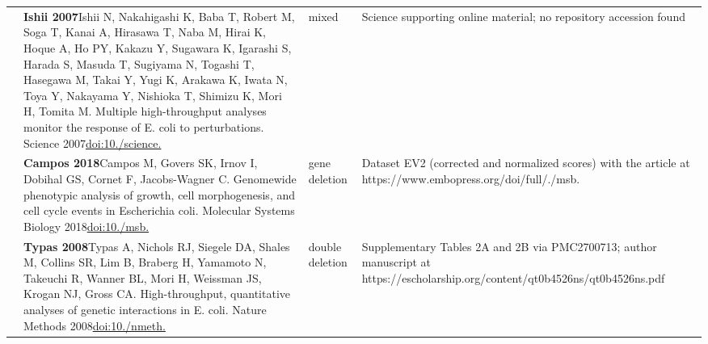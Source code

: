 \begin{landscape}
\begin{longtable}{@{}r@{\hspace{4pt}} L{86mm} L{74mm} L{78mm}@{}}
 & \textbf{Ishii 2007}\newline Ishii N, Nakahigashi K, Baba T, Robert M, Soga T, Kanai A, Hirasawa T, Naba M, Hirai K, Hoque A, Ho PY, Kakazu Y, Sugawara K, Igarashi S, Harada S, Masuda T, Sugiyama N, Togashi T, Hasegawa M, Takai Y, Yugi K, Arakawa K, Iwata N, Toya Y, Nakayama Y, Nishioka T, Shimizu K, Mori H, Tomita M. Multiple high-throughput analyses monitor the response of E. coli to perturbations. Science 2007\newline \href{https://doi.org/10.1126/science.1132067}{doi:10./\allowbreak science.} & mixed & Science supporting online material; no repository accession found \\
 & \textbf{Campos 2018}\newline Campos M, Govers SK, Irnov I, Dobihal GS, Cornet F, Jacobs-Wagner C. Genomewide phenotypic analysis of growth, cell morphogenesis, and cell cycle events in Escherichia coli. Molecular Systems Biology 2018\newline \href{https://doi.org/10.15252/msb.20177573}{doi:10./\allowbreak msb.} & gene deletion & Dataset EV2 (corrected and normalized scores) with the article at https:/\allowbreak /\allowbreak www.\allowbreak embopress.\allowbreak org/\allowbreak doi/\allowbreak full/./\allowbreak msb. \\
 & \textbf{Typas 2008}\newline Typas A, Nichols RJ, Siegele DA, Shales M, Collins SR, Lim B, Braberg H, Yamamoto N, Takeuchi R, Wanner BL, Mori H, Weissman JS, Krogan NJ, Gross CA. High-throughput, quantitative analyses of genetic interactions in E. coli. Nature Methods 2008\newline \href{https://doi.org/10.1038/nmeth.1240}{doi:10./\allowbreak nmeth.} & double deletion & Supplementary Tables 2A and 2B via PMC2700713; author manuscript at https:/\allowbreak /\allowbreak escholarship.\allowbreak org/\allowbreak content/\allowbreak qt0b4526ns/\allowbreak qt0b4526ns.\allowbreak pdf \\

\end{longtable}
\end{landscape}
